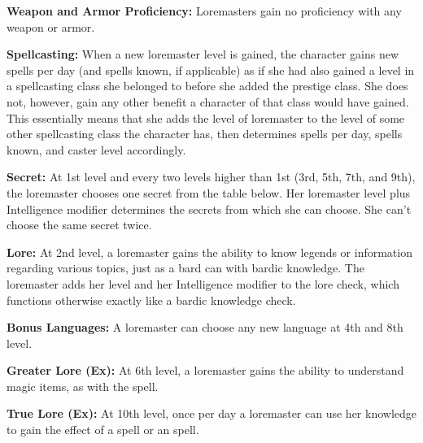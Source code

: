 {
\textbf{Weapon and Armor Proficiency:} Loremasters gain no proficiency with any weapon or armor.

\textbf{Spellcasting:} When a new loremaster level is gained, the character gains new spells per day (and spells known, if applicable) as if she had also gained a level in a spellcasting class she belonged to before she added the prestige class. She does not, however, gain any other benefit a character of that class would have gained. This essentially means that she adds the level of loremaster to the level of some other spellcasting class the character has, then determines spells per day, spells known, and caster level accordingly.

\textbf{Secret:} At 1st level and every two levels higher than 1st (3rd, 5th, 7th, and 9th), the loremaster chooses one secret from the table below. Her loremaster level plus Intelligence modifier determines the secrets from which she can choose. She can't choose the same secret twice.


\textbf{Lore:} At 2nd level, a loremaster gains the ability to know legends or information regarding various topics, just as a bard can with bardic knowledge. The loremaster adds her level and her Intelligence modifier to the lore check, which functions otherwise exactly like a bardic knowledge check.

\textbf{Bonus Languages:} A loremaster can choose any new language at 4th and 8th level.

\textbf{Greater Lore (Ex):} At 6th level, a loremaster gains the ability to understand magic items, as with the  spell.

\textbf{True Lore (Ex):} At 10th level, once per day a loremaster can use her knowledge to gain the effect of a  spell or an  spell.
}
